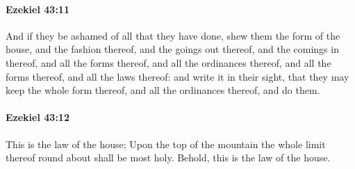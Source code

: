 		\paragraph{Ezekiel 43:11} %
			\label{EZEKIEL-43-11}

			And if they be ashamed of all that they have done, shew them the form of the house, and the fashion thereof, and the goings out thereof, and the comings in thereof, and all the forms thereof, and all the ordinances thereof, and all the forms thereof, and all the laws thereof: and write it in their sight, that they may keep the whole form thereof, and all the ordinances thereof, and do them.


		\paragraph{Ezekiel 43:12} %
			\label{EZEKIEL-43-12}

			This is the law of the house; Upon the top of the mountain the whole limit thereof round about shall be most holy. Behold, this is the law of the house.

